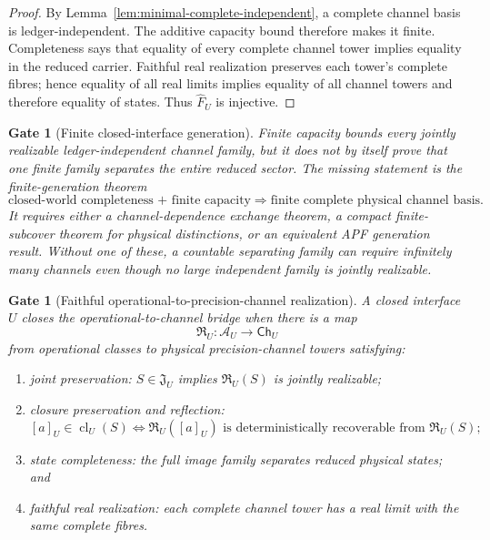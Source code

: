 \documentclass[11pt]{article}
\newtheorem{gate}[theorem]{Gate}
\theoremstyle{remark}
\begin{document}
\begin{proof}
By Lemma~\ref{lem:minimal-complete-independent}, a complete channel basis is
ledger-independent.  The additive capacity bound therefore makes it finite.
Completeness says that equality of every complete channel tower implies equality
in the reduced carrier.  Faithful real realization preserves each tower's complete fibres; hence equality of all real limits implies equality of all channel towers and therefore equality of states.  Thus $\widehat F_U$ is injective.
\end{proof}

\begin{gate}[Finite closed-interface generation]
\label{gate:finite-closed-interface-generation}
Finite capacity bounds every jointly realizable ledger-independent channel
family, but it does not by itself prove that one finite family separates the
entire reduced sector. The missing statement is the finite-generation theorem
\[
\boxed{\text{closed-world completeness + finite capacity}
\Longrightarrow\text{finite complete physical channel basis}.}
\]
It requires either a channel-dependence exchange theorem, a compact finite-subcover
theorem for physical distinctions, or an equivalent APF generation result.
Without one of these, a countable separating family can require infinitely many
channels even though no large independent family is jointly realizable.
\end{gate}

\begin{gate}[Faithful operational-to-precision-channel realization]
\label{gate:operational-to-precision-channel}
A closed interface $U$ closes the operational-to-channel bridge when there is a
map
\[
  \mathfrak R_U:\mathcal A_U\longrightarrow\mathsf{Ch}_U
\]
from operational classes to physical precision-channel towers satisfying:
\begin{enumerate}[label=(\roman*)]
\item \emph{joint preservation:} $S\in\mathfrak J_U$ implies
$\mathfrak R_U(S)$ is jointly realizable;
\item \emph{closure preservation and reflection:}
\[
  [a]_U\in\operatorname{cl}_U(S)
  \iff
  \mathfrak R_U([a]_U)
  \text{ is deterministically recoverable from }\mathfrak R_U(S);
\]
\item \emph{state completeness:} the full image family separates reduced
physical states; and
\item \emph{faithful real realization:} each complete channel tower has a real
limit with the same complete fibres.
\end{enumerate}
\end{gate}
\end{document}

